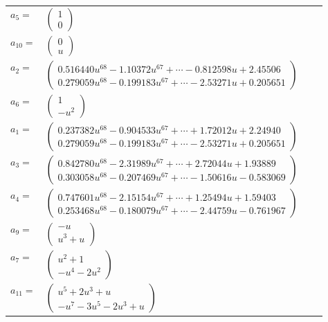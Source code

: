 \documentclass[1p]{elsarticle_modified}
\theoremstyle{definition}
\begin{document}
\begin{tabular}{m{7pt} m{180pt} m{7pt} m{180pt} }
\flushright $a_{5}=$&$\begin{pmatrix}1\\0\end{pmatrix}$ \\
\flushright $a_{10}=$&$\begin{pmatrix}0\\u\end{pmatrix}$ \\
\flushright $a_{2}=$&$\begin{pmatrix}0.516440 u^{68}-1.10372 u^{67}+\cdots-0.812598 u+2.45506\\0.279059 u^{68}-0.199183 u^{67}+\cdots-2.53271 u+0.205651\end{pmatrix}$ \\
\flushright $a_{6}=$&$\begin{pmatrix}1\\- u^2\end{pmatrix}$ \\
\flushright $a_{1}=$&$\begin{pmatrix}0.237382 u^{68}-0.904533 u^{67}+\cdots+1.72012 u+2.24940\\0.279059 u^{68}-0.199183 u^{67}+\cdots-2.53271 u+0.205651\end{pmatrix}$ \\
\flushright $a_{3}=$&$\begin{pmatrix}0.842780 u^{68}-2.31989 u^{67}+\cdots+2.72044 u+1.93889\\0.303058 u^{68}-0.207469 u^{67}+\cdots-1.50616 u-0.583069\end{pmatrix}$ \\
\flushright $a_{4}=$&$\begin{pmatrix}0.747601 u^{68}-2.15154 u^{67}+\cdots+1.25494 u+1.59403\\0.253468 u^{68}-0.180079 u^{67}+\cdots-2.44759 u-0.761967\end{pmatrix}$ \\
\flushright $a_{9}=$&$\begin{pmatrix}- u\\u^3+u\end{pmatrix}$ \\
\flushright $a_{7}=$&$\begin{pmatrix}u^2+1\\- u^4-2 u^2\end{pmatrix}$ \\
\flushright $a_{11}=$&$\begin{pmatrix}u^5+2 u^3+u\\- u^7-3 u^5-2 u^3+u\end{pmatrix}$ \\

\end{tabular}
\end{document}
